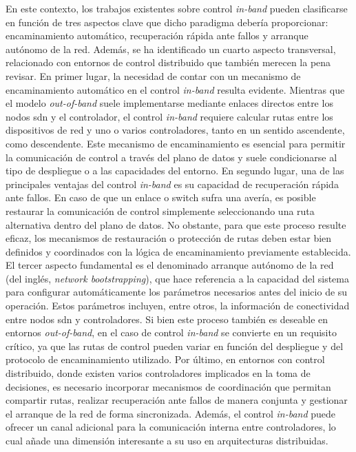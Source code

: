 En este contexto, los trabajos existentes sobre control \textit{in-band} pueden clasificarse en función de tres aspectos clave que dicho paradigma debería proporcionar: encaminamiento automático, recuperación rápida ante fallos y arranque autónomo de la red. Además, se ha identificado un cuarto aspecto transversal, relacionado con entornos de control distribuido que también merecen la pena revisar. En primer lugar, la necesidad de contar con un mecanismo de encaminamiento automático en el control \textit{in-band} resulta evidente. Mientras que el modelo \textit{out-of-band} suele implementarse mediante enlaces directos entre los nodos \gls{sdn} y el controlador, el control \textit{in-band} requiere calcular rutas entre los dispositivos de red y uno o varios controladores, tanto en un sentido ascendente, como descendente. Este mecanismo de encaminamiento es esencial para permitir la comunicación de control a través del plano de datos y suele condicionarse al tipo de despliegue o a las capacidades del entorno. En segundo lugar, una de las principales ventajas del control \textit{in-band} es su capacidad de recuperación rápida ante fallos. En caso de que un enlace o switch sufra una avería, es posible restaurar la comunicación de control simplemente seleccionando una ruta alternativa dentro del plano de datos. No obstante, para que este proceso resulte eficaz, los mecanismos de restauración o protección de rutas deben estar bien definidos y coordinados con la lógica de encaminamiento previamente establecida. El tercer aspecto fundamental es el denominado arranque autónomo de la red (del inglés, \textit{network bootstrapping}), que hace referencia a la capacidad del sistema para configurar automáticamente los parámetros necesarios antes del inicio de su operación. Estos parámetros incluyen, entre otros, la información de conectividad entre nodos \gls{sdn} y controladores. Si bien este proceso también es deseable en entornos \textit{out-of-band}, en el caso de control \textit{in-band} se convierte en un requisito crítico, ya que las rutas de control pueden variar en función del despliegue y del protocolo de encaminamiento utilizado. Por último, en entornos con control distribuido, donde existen varios controladores implicados en la toma de decisiones, es necesario incorporar mecanismos de coordinación que permitan compartir rutas, realizar recuperación ante fallos de manera conjunta y gestionar el arranque de la red de forma sincronizada. Además, el control \textit{in-band} puede ofrecer un canal adicional para la comunicación interna entre controladores, lo cual añade una dimensión interesante a su uso en arquitecturas distribuidas.\\

